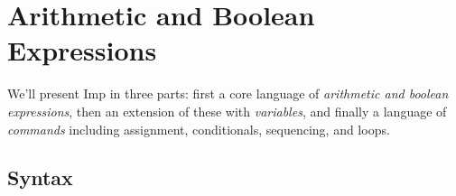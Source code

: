 \documentclass[12pt]{report}
\begin{document}
\section{Arithmetic and Boolean Expressions}



 We'll present Imp in three parts: first a core language of
    \textit{arithmetic and boolean expressions}, then an extension of these
    with \textit{variables}, and finally a language of \textit{commands} including
    assignment, conditionals, sequencing, and loops. 
\begin{coqdoccode}
\coqdocemptyline
\end{coqdoccode}
\subsection{Syntax}
\end{document}
